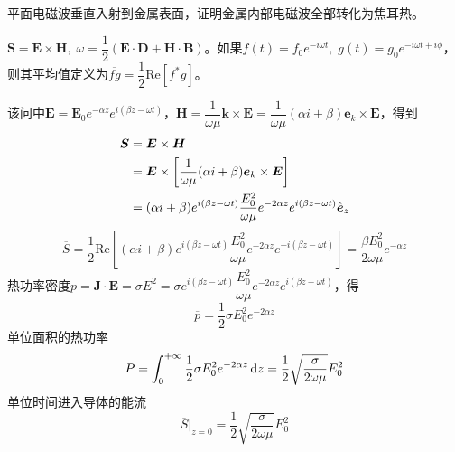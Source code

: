 \documentclass{mynote}
\begin{document}
\begin{exercise}{4.6}
平面电磁波垂直入射到金属表面，证明金属内部电磁波全部转化为焦耳热。
\end{exercise}
\begin{solution}
$\bm{S} = \bm{E} \times \bm{H},\; \omega = \dfrac{1}{2} (\bm{E} \cdot \bm{D} + \bm{H} \cdot \bm{B})$。如果$f(t) = f_0 e^{-i \omega t},\; g(t) = g_0 e^{-i\omega t + i \phi}$，则其平均值定义为$\overline{fg} = \dfrac{1}{2} \textrm{Re} \left[ f^*g \right]$。

该问中$\bm{E} = \bm{E}_0 e^{-\alpha z} e^{i(\beta z - \omega t)}$，$\bm{H} = \dfrac{1}{\omega \mu} \bm{k} \times \bm{E} = \dfrac{1}{\omega \mu} (\alpha i + \beta) \bm{e}_k \times \bm{E}$，得到
\begin{align*}
\boldsymbol{S} &= \boldsymbol{E} \times \boldsymbol{H} \\
&= \boldsymbol{E} \times \left[ \frac{1}{\omega \mu} (\alpha i + \beta) \boldsymbol{e}_k \times \boldsymbol{E} \right]\\
&= (\alpha i + \beta) e^{i (\beta z - \omega t)} \dfrac{E_0^2}{\omega \mu} e^{-2\alpha z} e^{i(\beta z - \omega t)} \hat{\boldsymbol{e}}_z
\end{align*}
\[
\overline{S} = \frac{1}{2} \textrm{Re} \left[ (\alpha i + \beta) e^{i (\beta z - \omega t)} \dfrac{E_0^2}{\omega \mu} e^{-2\alpha z} e^{-i(\beta z - \omega t)} \right] = \frac{\beta E_0^2}{2\omega \mu} e^{-\alpha z}
\]
热功率密度$ p = \bm{J} \cdot \bm{E} = \sigma E^2 =  \sigma e^{i (\beta z - \omega t)} \dfrac{E_0^2}{\omega \mu} e^{-2\alpha z} e^{i(\beta z - \omega t)}$，得
\[
\overline{p} = \frac{1}{2} \sigma E_0^2 e^{-2 \alpha z}    
\]
单位面积的热功率
\[
P = \int_0^{+\infty} \frac{1}{2} \sigma E_0^2 e^{-2 \alpha z} \mathop{}\!\mathrm{d} z = \frac{1}{2} \sqrt{\frac{\sigma}{2\omega \mu}} E_0^2
\]
单位时间进入导体的能流
\[
\overline{S}|_{z=0} =  \frac{1}{2} \sqrt{\frac{\sigma}{2\omega \mu}} E_0^2
\]
\end{solution}
\end{document}

